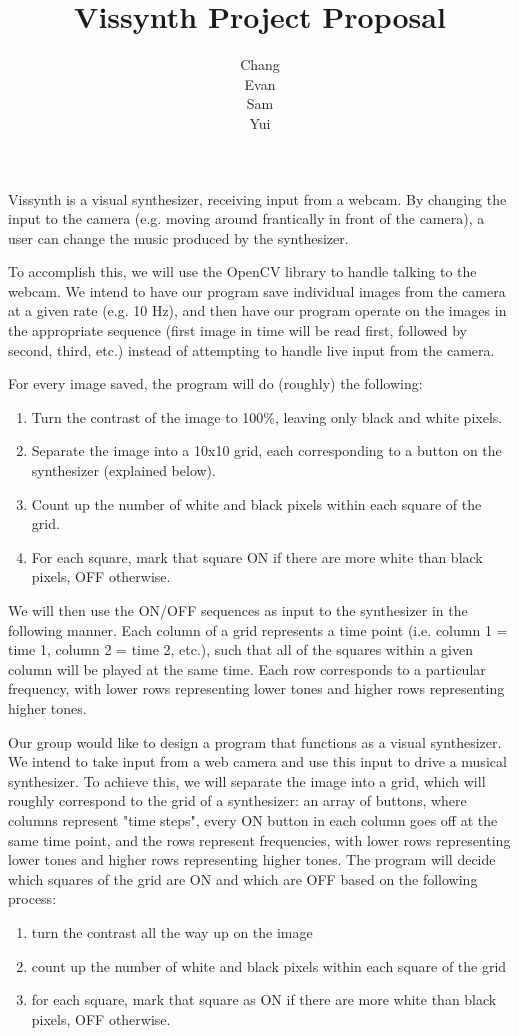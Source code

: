 \documentclass{article}
\title{Vissynth Project Proposal}
\author{Chang \\ Evan \\ Sam \\ Yui}
\begin{document}
\maketitle

Vissynth is a visual synthesizer, receiving input from a webcam.
By changing the input to the camera (e.g. moving around
frantically in front of the camera), a user can change the music
produced by the synthesizer.

To accomplish this, we will use the OpenCV library to handle
talking to the webcam. We intend to have our program save
individual images from the camera at a given rate (e.g. 10 Hz),
and then have our program operate on the images in the appropriate
sequence (first image in time will be read first, followed by
second, third, etc.) instead of attempting to handle live input
from the camera.

For every image saved, the program will do (roughly) the
following:

\begin{enumerate}
  \item Turn the contrast of the image to 100\%, leaving only black and white pixels.
  \item Separate the image into a 10x10 grid, each corresponding to a button on the synthesizer (explained below).
  \item Count up the number of white and black pixels within each square of the grid.
  \item For each square, mark that square ON if there are more white than black pixels, OFF otherwise.
\end{enumerate}

We will then use the ON/OFF sequences as input to the synthesizer
in the following manner. Each column of a grid represents a time
point (i.e. column 1 = time 1, column 2 = time 2, etc.), such that
all of the squares within a given column will be played at the
same time. Each row corresponds to a particular frequency, with
lower rows representing lower tones and higher rows representing
higher tones.

Our group would like to design a program that functions as a
visual synthesizer. We intend to take input from a web camera and
use this input to drive a musical synthesizer. To achieve this, we
will separate the image into a grid, which will roughly correspond
to the grid of a synthesizer: an array of buttons, where columns
represent "time steps", every ON button in each column goes off at
the same time point, and the rows represent frequencies, with
lower rows representing lower tones and higher rows representing
higher tones. The program will decide which squares of the grid
are ON and which are OFF based on the following process:

\begin{enumerate}
  \item turn the contrast all the way up on the image
  \item count up the number of white and black pixels within each square of the grid
  \item for each square, mark that square as ON if there are more white than black pixels, OFF otherwise.
\end{enumerate}
\end{document}
